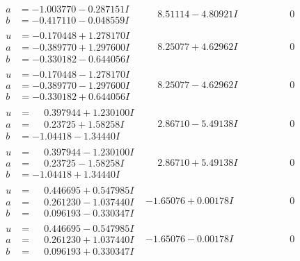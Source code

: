 \documentclass[1p]{elsarticle_modified}
\theoremstyle{definition}
\begin{document}
$$\begin{array}{c|c|c}
\begin{aligned}
a &= -1.003770 - 0.287151 I \\
b &= -0.417110 - 0.048559 I\end{aligned}
 & \phantom{-}8.51114 - 4.80921 I & \phantom{-0.000000 } 0 \\ \hline\begin{aligned}
u &= -0.170448 + 1.278170 I \\
a &= -0.389770 + 1.297600 I \\
b &= -0.330182 - 0.644056 I\end{aligned}
 & \phantom{-}8.25077 + 4.62962 I & \phantom{-0.000000 } 0 \\ \hline\begin{aligned}
u &= -0.170448 - 1.278170 I \\
a &= -0.389770 - 1.297600 I \\
b &= -0.330182 + 0.644056 I\end{aligned}
 & \phantom{-}8.25077 - 4.62962 I & \phantom{-0.000000 } 0 \\ \hline\begin{aligned}
u &= \phantom{-}0.397944 + 1.230100 I \\
a &= \phantom{-}0.23725 + 1.58258 I \\
b &= -1.04418 - 1.34440 I\end{aligned}
 & \phantom{-}2.86710 - 5.49138 I & \phantom{-0.000000 } 0 \\ \hline\begin{aligned}
u &= \phantom{-}0.397944 - 1.230100 I \\
a &= \phantom{-}0.23725 - 1.58258 I \\
b &= -1.04418 + 1.34440 I\end{aligned}
 & \phantom{-}2.86710 + 5.49138 I & \phantom{-0.000000 } 0 \\ \hline\begin{aligned}
u &= \phantom{-}0.446695 + 0.547985 I \\
a &= \phantom{-}0.261230 - 1.037440 I \\
b &= \phantom{-}0.096193 - 0.330347 I\end{aligned}
 & -1.65076 + 0.00178 I & \phantom{-0.000000 } 0 \\ \hline\begin{aligned}
u &= \phantom{-}0.446695 - 0.547985 I \\
a &= \phantom{-}0.261230 + 1.037440 I \\
b &= \phantom{-}0.096193 + 0.330347 I\end{aligned}
 & -1.65076 - 0.00178 I & \phantom{-0.000000 } 0 \\ \hline\begin{aligned}

\end{aligned}
\end{array}$$
\end{document}
